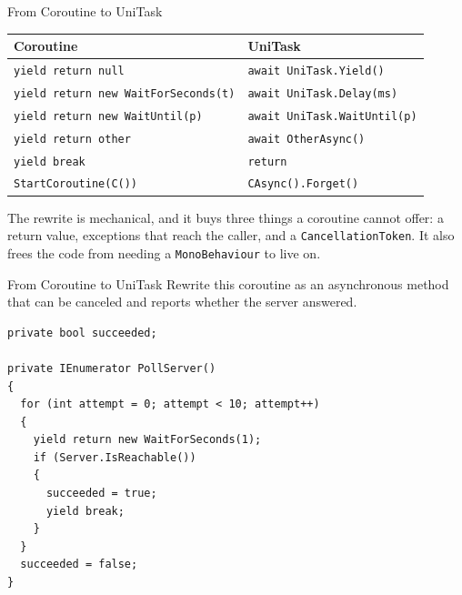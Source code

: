\begin{frame}[fragile]{From Coroutine to UniTask}
  \begin{center}
    \footnotesize
    \begin{tabular}{ll}
      \hline
      \textbf{Coroutine} & \textbf{UniTask}\\
      \hline
      \texttt{yield return null}              & \texttt{await UniTask.Yield()}\\
      \texttt{yield return new WaitForSeconds(t)} & \texttt{await UniTask.Delay(ms)}\\
      \texttt{yield return new WaitUntil(p)}   & \texttt{await UniTask.WaitUntil(p)}\\
      \texttt{yield return other}              & \texttt{await OtherAsync()}\\
      \texttt{yield break}                     & \texttt{return}\\
      \texttt{StartCoroutine(C())}             & \texttt{CAsync().Forget()}\\
      \hline
    \end{tabular}
  \end{center}
  \vspace{2ex}

  The rewrite is mechanical, and it buys three things a coroutine cannot
  offer: a return value, exceptions that reach the caller, and a
  \texttt{CancellationToken}. It also frees the code from needing a
  \texttt{MonoBehaviour} to live on.
\end{frame}

\begin{exerciseframe}{From Coroutine to UniTask}
  Rewrite this coroutine as an asynchronous method that can be canceled and
  reports whether the server answered.
  \vspace{1ex}

  \begin{lstlisting}[basicstyle=\scriptsize\ttfamily]
private bool succeeded;

private IEnumerator PollServer()
{
  for (int attempt = 0; attempt < 10; attempt++)
  {
    yield return new WaitForSeconds(1);
    if (Server.IsReachable())
    {
      succeeded = true;
      yield break;
    }
  }
  succeeded = false;
}
  \end{lstlisting}
\end{exerciseframe}

